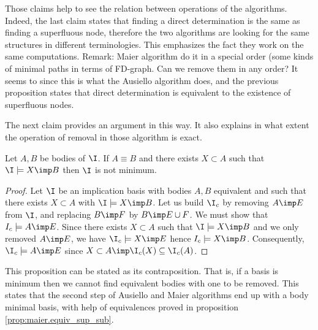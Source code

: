 Those claims help to see the relation between operations of the algorithms. 
Indeed, the last claim states that finding a direct determination is the same
as finding a superfluous node, therefore the two algorithms are looking for
the same structures in different terminologies. This emphasizes the fact they
work on the same computations. Remark: Maier algorithm do it in a special 
order (some kinds of minimal paths in terms of FD-graph. Can we remove them in 
any order? It seems to since this is what the Ausiello algorithm does, and
the previous proposition states that direct determination is equivalent to the
existence of superfluous nodes.

\vspace{1.2em}

The next claim provides an argument in this way. It also explains in what 
extent the operation of removal in those algorithm is exact.

\begin{proposition} Let $A, B$ be bodies of $\I$. If $A \equiv B$ and
	there exists $X \subset A$ such that $\I \models X \imp B$ then $\I$ is not
	minimum.
	
\end{proposition}

\begin{proof} Let $\I$ be an implication basis with bodies $A, B$ equivalent and
	such that there exists $X \subset A$ with $\I \models X \imp B$. Let us 
	build
	$\I_c$ by removing $A \imp E$ from $\I$, and replacing $B \imp F$ by $B \imp
	E \cup F$. We must show that $I_c \models A \imp E$. Since there exists $X 
	\subset A$ such that $\I \models X \imp B$ and we only removed $A \imp E$, 
	we
	have $\I_c \models X \imp E$ hence $I_c \models X \imp B$. Consequently, 
	$\I_c \models A \imp E$ since $X \subset A \imp \I_c(X) \subseteq \I_c(A)$.
\end{proof}

\vspace{1.2em}

This proposition can be stated as its contraposition. That is, if a basis is
minimum then we cannot find equivalent bodies with one to be removed. This 
states that the second step of Ausiello and Maier algorithms end up with a 
body minimal basis, with help of equivalences proved in proposition 
\ref{prop:maier.equiv_sup_sub}.














